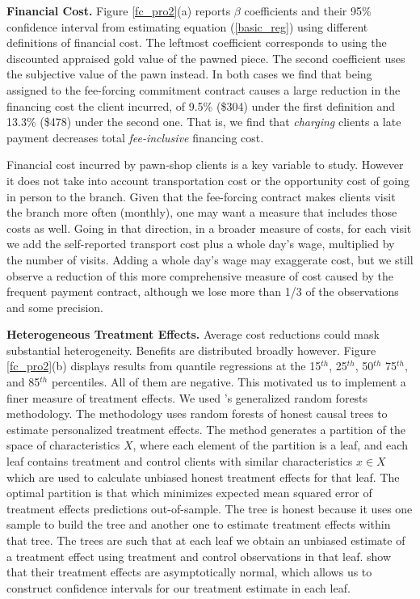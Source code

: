 \documentclass[oneside,11pt]{article}
\begin{document}
\vspace{.2in}
\noindent \textbf{Financial Cost.} Figure \ref{fc_pro2}(a) reports $\beta$ coefficients and their 95\% confidence interval from estimating equation (\ref{basic_reg}) using different definitions of financial cost. The leftmost coefficient corresponds to using the discounted appraised gold value of the pawned piece. The second coefficient uses the subjective value of the pawn instead. In both cases we find that being assigned to the fee-forcing commitment contract causes a large reduction in the financing cost the client incurred, of 9.5\% (\$304) under the first definition and 13.3\% (\$478) under the second one. That is, we find that \textit{charging} clients a late payment decreases total \textit{fee-inclusive} financing cost. 

Financial cost incurred by pawn-shop clients is a key variable to study. However it does not take into account transportation cost or the opportunity cost of going in person to the branch. Given that the fee-forcing contract makes clients visit the branch more often (monthly), one may want a measure that includes those costs as well. Going in that direction, in a broader measure of costs, for each visit we add the self-reported transport cost plus a whole day's wage, multiplied by the number of visits. Adding a whole day's wage may exaggerate cost, but we still observe a reduction of this more comprehensive measure of cost caused by the frequent payment contract, although we lose more than 1/3 of the observations and some precision. 

\vspace{.2in}
\noindent \textbf{Heterogeneous Treatment Effects.} Average cost reductions could mask substantial heterogeneity. Benefits are distributed broadly however. Figure \ref{fc_pro2}(b) displays results from quantile regressions at the 15$^{th}$, 25$^{th}$, 50$^{th}$ 75$^{th}$, and 85$^{th}$ percentiles. All of them are negative. This motivated us to implement a finer measure of treatment effects. We used  \cite{atheygrf}'s generalized random forests methodology. The methodology uses random forests of honest causal trees to estimate personalized treatment effects. The method generates a partition of the space of characteristics $X$, where each element of the partition is a leaf, and each leaf contains treatment and control clients with similar characteristics $x \in X$ which are used to calculate unbiased honest treatment effects for that leaf. The optimal partition is that which minimizes expected mean squared error of treatment effects predictions out-of-sample. The tree is honest because it uses one sample to build the tree and another one to estimate treatment effects within that tree.  The trees are such that at each leaf we obtain an unbiased estimate of a treatment effect using treatment and control observations in that leaf. \cite{atheygrf} show that their treatment effects are asymptotically normal, which allows us to construct confidence intervals for our treatment estimate in each leaf. 
\end{document}
